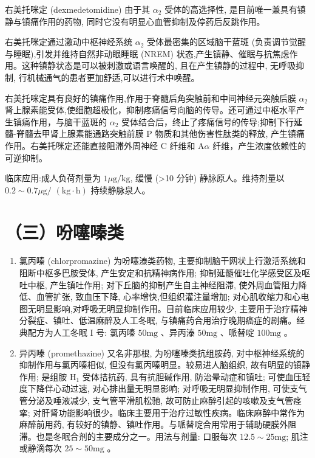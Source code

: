 \documentclass[10pt]{article}
\begin{document}
右美托咪定 (dexmedetomidine) 由于其 $\alpha_{2}$ 受体的高选择性, 是目前唯一兼具有镇静与镇痛作用的药物, 同时它没有明显心血管抑制及停药后反跳作用。

右美托咪定通过激动中枢神经系统 $\alpha_{2}$ 受体最密集的区域脑干蓝斑 (负责调节觉醒与睡眠),引发并维持自然非动眼睡眠 (NREM) 状态,产生镇静、催眠与抗焦虑作用。这种镇静状态是可以被刺激或语言唤醒的, 且在产生镇静的过程中, 无呼吸抑制, 行机械通气的患者更加舒适,可以进行术中唤醒。

右美托咪定具有良好的镇痛作用,作用于脊髓后角突触前和中间神经元突触后膜 $\alpha_{2}$ 肾上腺素能受体,使细胞超极化，抑制疼痛信号向脑的传导。还可通过中枢水平产生镇痛作用，与脑干蓝斑的 $\alpha_{2}$ 受体结合后，终止了疼痛信号的传导;抑制下行延髓-脊髓去甲肾上腺素能通路突触前膜 P 物质和其他伤害性肽类的释放, 产生镇痛作用。右美托咪定还能直接阻滞外周神经 $\mathrm{C}$ 纤维和 $\mathrm{A} \alpha$ 纤维，产生浓度依赖性的可逆抑制。

临床应用:成人负荷剂量为 $1 \mu \mathrm{g} / \mathrm{kg}$, 缓慢 (>10 分钟) 静脉原人。维持剂量以 $0.2 \sim 0.7 \mu \mathrm{g} /$ $(\mathrm{kg} \cdot \mathrm{h})$ 持续静脉泉人。

\section*{（三）吩噻嗪类}
\begin{enumerate}
  \item 氯丙嗪 (chlorpromazine) 为吩噻溙类药物, 主要抑制脑干网状上行激活系统和阻断中枢多巴胺受体, 产生安定和抗精神病作用; 抑制延髓催吐化学感受区及呕吐中枢, 产生镇吐作用; 对下丘脑的抑制产生自主神经阻滞, 使外周血管阻力降低、血管扩张, 致血压下降, 心率增快,但组织灌注量增加; 对心肌收缩力和心电图无明显影响,对呼吸无明显抑制作用。目前临床应用较少, 主要用于治疗精神分裂症、镇吐、低温麻醉及人工冬眠, 与镇痛药合用治疗晚期癌症的剧痛。经典配方为人工冬眠 I 号: 氯丙嗪 $50 \mathrm{mg}$ 、异丙溙 $50 \mathrm{mg}$ 、哌替啶 $100 \mathrm{mg}$ 。

  \item 异丙嗪 (promethazine) 又名非那根, 为吩噻嗪类抗组胺药, 对中枢神经系统的抑制作用与氯丙嗪相似, 但没有氯丙嗪明显。较易进人脑组织, 故有明显的镇静作用; 是组胺 $\mathrm{H}_{1}$ 受体拮抗药, 具有抗胆碱作用, 防治晕动症和镇吐; 可使血压轻度下降伴心动过速, 对心排出量无明显影响; 对呼吸无明显抑制作用, 可使支气管分泌及唾液减少, 支气管平滑肌松驰, 故可防止麻醉引起的咳嗽及支气管痉挛; 对肝肾功能影响很少。临床主要用于治疗过敏性疾病。临床麻醉中常作为麻醉前用药, 有较好的镇静、镇吐作用。与哌替啶合用常用于辅助硬膜外阻滞。也是冬眠合剂的主要成分之一。用法与剂量: 口服每次 $12.5 \sim 25 \mathrm{mg}$; 肌注或静滴每次 $25 \sim 50 \mathrm{mg}$ 。

\end{enumerate}
\end{document}
